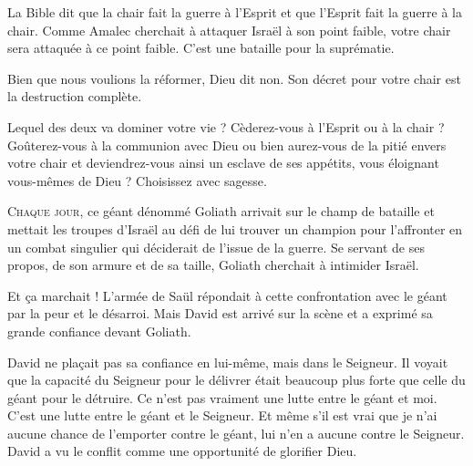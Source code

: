 La Bible dit que la chair fait la guerre à l'Esprit et que l'Esprit
 fait la guerre à la chair.
 Comme Amalec cherchait à attaquer Israël à son point faible,
 votre chair sera attaquée à ce point faible.
 C'est une bataille pour la suprématie.


Bien que nous voulions la réformer, Dieu dit non.
 Son décret pour votre chair est la destruction complète.

Lequel des deux va dominer votre vie ?
 Cèderez-vous à l'Esprit ou à la chair ?
 Goûterez-vous à la communion avec Dieu ou bien aurez-vous
 de la pitié envers votre chair et deviendrez-vous ainsi
 un esclave de ses appétits, vous éloignant vous-mêmes de Dieu ?
 Choisissez avec sagesse. 

\dvrule






\lettrine{C}{haque jour}, ce géant dénommé Goliath arrivait
 sur le champ de bataille et mettait les troupes d'Israël
 au défi de lui trouver un champion pour l'affronter
 en un combat singulier qui déciderait de l'issue de la guerre.
 Se servant de ses propos, de son armure et de sa taille,
 Goliath cherchait à intimider Israël. 

Et \c{c}a marchait ! L'armée de Saül répondait à cette confrontation
 avec le géant par la peur et le désarroi.
 Mais David est arrivé sur la scène et a exprimé
 sa grande confiance devant Goliath.

David ne pla\c{c}ait pas sa confiance en lui-même, mais dans le Seigneur.
 Il voyait que la capacité du Seigneur pour le délivrer était
 beaucoup plus forte que celle du géant pour le détruire.
 \Og Ce n'est pas vraiment une lutte entre le géant et moi.
 C'est une lutte entre le géant et le Seigneur.
 Et même s'il est vrai que je n'ai aucune chance de l'emporter contre le géant,
 lui n'en a aucune contre le Seigneur. \Fg{}
 David a vu le conflit comme une opportunité de glorifier Dieu.

